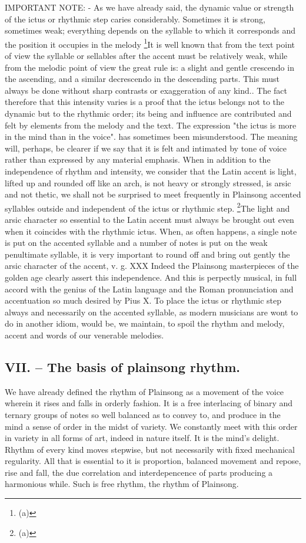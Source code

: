 IMPORTANT NOTE: - As we have already said, the dynamic value or strength of the ictus or rhythmic step caries considerably. Sometimes it is strong, sometimes weak; everything depends on the syllable to which it corresponds and the position it occupies in the melody \footnote{(a)}{It is well known that from the text point of view the syllable or sellables after the accent must be relatively weak, while from the melodic point of view the great rule is: a slight and gentle crescendo in the ascending, and a similar decrescendo in the descending parts. This must always be done without sharp contrasts or exaggeration of any kind.}. The fact therefore that this intensity varies is a proof that the ictus belongs not to the dynamic but to the rhythmic order; its being and influence are contributed and felt by elements from the melody and the text. The expression "the ictus is more in the mind than in the voice". has sometimes been misunderstood. The meaning will, perhaps, be clearer if we say that it is felt and intimated by tone of voice rather than expressed by any material emphasis. When in addition to the independence of rhythm and intensity, we consider that the Latin accent is light, lifted up and rounded off like an arch, is not heavy or strongly stressed, is arsic and not thetic, we shall not be surprised to meet frequently in Plainsong accented syllables outside and independent of the ictus or rhythmic step. \footnote{(a)}{The light and arsic character so essential to the Latin accent must always be brought out even when it coincides with the rhythmic ictus. When, as often happens, a single note is put on the accented syllable and a number of notes is put on the weak penultimate syllable, it is very important to round off and bring out gently the arsic character of the accent, v. g. XXX} Indeed the Plainsong masterpieces of the golden age clearly assert this independence. And this is perpectly musical, in full accord with the genius of the Latin language and the Roman pronunciation and accentuation so much desired by Pius X. To place the ictus or rhythmic step always and necessarily on the accented syllable, as modern musicians are wont to do in another idiom, would be, we maintain, to spoil the rhythm and melody, accent and words of our venerable melodies.

\subsection{VII. -- The basis of plainsong rhythm.}

We have already defined the rhythm of Plainsong as a movement of the voice wherein it rises and falls in orderly fashion. It is a free interlacing of binary and ternary groups of notes so well balanced as to convey to, and produce in the mind a sense of order in the midst of variety. We constantly meet with this order in variety in all forms of art, indeed in nature itself. It is the mind's delight. Rhythm of every kind moves stepwise, but not necessarily with fixed mechanical regularity. All that is essential to it is proportion, balanced movement and repose, rise and fall, the due correlation and interdepencence of parts producing a harmonious while. Such is free rhythm, the rhythm of Plainsong.

